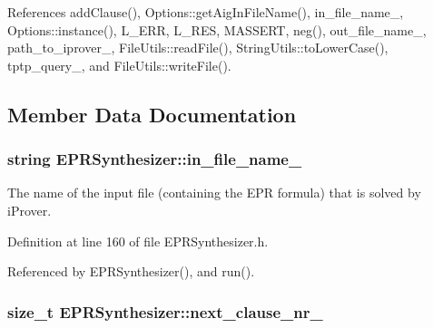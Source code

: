References add\-Clause(), Options\-::get\-Aig\-In\-File\-Name(), in\-\_\-file\-\_\-name\-\_\-, Options\-::instance(), L\-\_\-\-E\-R\-R, L\-\_\-\-R\-E\-S, M\-A\-S\-S\-E\-R\-T, neg(), out\-\_\-file\-\_\-name\-\_\-, path\-\_\-to\-\_\-iprover\-\_\-, File\-Utils\-::read\-File(), String\-Utils\-::to\-Lower\-Case(), tptp\-\_\-query\-\_\-, and File\-Utils\-::write\-File().



\subsection{Member Data Documentation}
\hypertarget{classEPRSynthesizer_a95c4d232fec2376be891c6ddc96610ce}{
\subsubsection[{in\-\_\-file\-\_\-name\-\_\-}]{\setlength{\rightskip}{0pt plus 5cm}string E\-P\-R\-Synthesizer\-::in\-\_\-file\-\_\-name\-\_\-\hspace{0.3cm}{\ttfamily [protected]}}}\label{classEPRSynthesizer_a95c4d232fec2376be891c6ddc96610ce}


The name of the input file (containing the E\-P\-R formula) that is solved by i\-Prover. 



Definition at line 160 of file E\-P\-R\-Synthesizer.\-h.



Referenced by E\-P\-R\-Synthesizer(), and run().

\hypertarget{classEPRSynthesizer_a14d30bb922f975a1f195965d876784cb}{
\subsubsection[{next\-\_\-clause\-\_\-nr\-\_\-}]{\setlength{\rightskip}{0pt plus 5cm}size\-\_\-t E\-P\-R\-Synthesizer\-::next\-\_\-clause\-\_\-nr\-\_\-\hspace{0.3cm}{\ttfamily [protected]}}}\label{classEPRSynthesizer_a14d30bb922f975a1f195965d876784cb}


